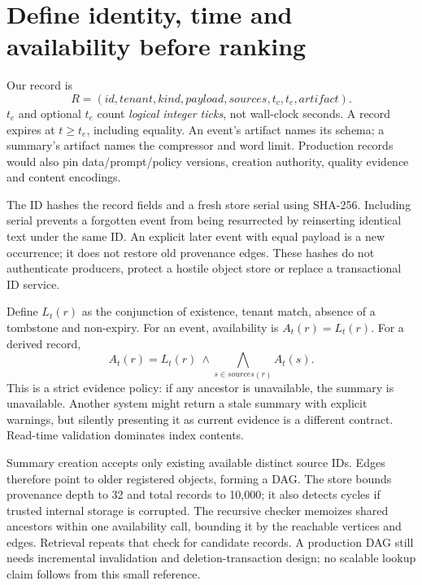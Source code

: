 \section{Define identity, time and availability before ranking}
\label{evod40:records}
Our record is
\[
 R=(id,tenant,kind,payload,sources,t_c,t_e,artifact).
\]
$t_c$ and optional $t_e$ count \emph{logical integer ticks}, not wall-clock
seconds. A record expires at $t\ge t_e$, including equality. An event's
artifact names its schema; a summary's artifact names the compressor and word
limit. Production records would also pin data/prompt/policy versions, creation
authority, quality evidence and content encodings.

The ID hashes the record fields and a fresh store serial using SHA-256.
Including serial prevents a forgotten event from being resurrected by
reinserting identical text under the same ID. An explicit later event with
equal payload is a new occurrence; it does not restore old provenance edges.
These hashes do not authenticate producers, protect a hostile object store
or replace a transactional ID service.

Define $L_t(r)$ as the conjunction of existence, tenant match, absence of a
tombstone and non-expiry. For an event, availability is $A_t(r)=L_t(r)$.
For a derived record,
\begin{equation}
 A_t(r)=L_t(r)\ \wedge\!\bigwedge_{s\in sources(r)} A_t(s).
 \label{evod40:availability}
\end{equation}
This is a strict evidence policy: if any ancestor is unavailable, the summary
is unavailable. Another system might return a stale summary with explicit
warnings, but silently presenting it as current evidence is a different
contract. Read-time validation dominates index contents.

Summary creation accepts only existing available distinct source IDs.
Edges therefore point to older registered objects, forming a DAG. The store
bounds provenance depth to 32 and total records to 10,000; it also detects
cycles if trusted internal storage is corrupted. The recursive checker memoizes
shared ancestors within one availability call, bounding it by the reachable
vertices and edges. Retrieval repeats that check for candidate records.
A production DAG still needs incremental invalidation and deletion-transaction
design; no scalable lookup claim follows from this small reference.

